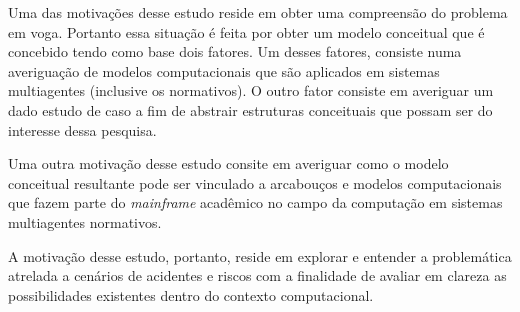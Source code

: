 Uma das motivações desse estudo reside em obter uma compreensão do problema em voga. Portanto essa situação é feita por obter um modelo conceitual que é concebido tendo como base dois fatores. Um desses fatores, consiste numa averiguação de modelos computacionais que são aplicados em sistemas multiagentes (inclusive os normativos). O outro fator consiste em averiguar um dado estudo de caso a fim de abstrair estruturas conceituais que possam ser do interesse dessa pesquisa.

Uma outra motivação desse estudo consite em averiguar como o modelo conceitual resultante pode ser vinculado a arcabouços e modelos computacionais que fazem parte do \textit{mainframe} acadêmico no campo da computação em sistemas multiagentes normativos.

A motivação desse estudo, portanto, reside em explorar e entender a problemática atrelada a cenários de acidentes e riscos com a finalidade de avaliar em clareza as possibilidades existentes dentro do contexto computacional.